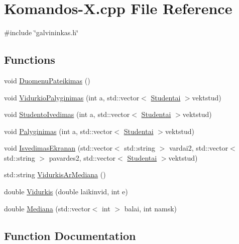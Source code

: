 \hypertarget{_komandos-_x_8cpp}{}\section{Komandos-\/X.cpp File Reference}
\label{_komandos-_x_8cpp}
{\ttfamily \#include \char`\"{}galvininkas.\+h\char`\"{}}\newline
\subsection*{Functions}
\begin{DoxyCompactItemize}
\item 
void \mbox{\hyperlink{_komandos-_x_8cpp_ac2cf944f764c5ea6b285cb2e188d9867}{Duomenu\+Pateikimas}} ()
\item 
void \mbox{\hyperlink{_komandos-_x_8cpp_a0dfe7eb39e8dd9d8c83d866739c5c712}{Vidurkio\+Palyginimas}} (int a, std\+::vector$<$ \mbox{\hyperlink{class_studentai}{Studentai}} $>$vektstud)
\item 
void \mbox{\hyperlink{_komandos-_x_8cpp_a1fb40ae6d3463fe6cce823fd3261abe5}{Studento\+Ivedimas}} (int a, std\+::vector$<$ \mbox{\hyperlink{class_studentai}{Studentai}} $>$vektstud)
\item 
void \mbox{\hyperlink{_komandos-_x_8cpp_a32e6fe3b9a2349d258a6f67ce0331b0c}{Palyginimas}} (int a, std\+::vector$<$ \mbox{\hyperlink{class_studentai}{Studentai}} $>$vektstud)
\item 
void \mbox{\hyperlink{_komandos-_x_8cpp_ae8c00302f468b7b77bd196d1058b3d00}{Isvedimas\+Ekranan}} (std\+::vector$<$ std\+::string $>$ vardai2, std\+::vector$<$ std\+::string $>$ pavardes2, std\+::vector$<$ \mbox{\hyperlink{class_studentai}{Studentai}} $>$vektstud)
\item 
std\+::string \mbox{\hyperlink{_komandos-_x_8cpp_ac18b091e5da5d98faf40a60e2dfac1c3}{Vidurkis\+Ar\+Mediana}} ()
\item 
double \mbox{\hyperlink{_komandos-_x_8cpp_a12fea27f5ccb0b6914f7fd90bc888be9}{Vidurkis}} (double laikinvid, int e)
\item 
double \mbox{\hyperlink{_komandos-_x_8cpp_a7d536233ded6efdd4a660ea68fd71368}{Mediana}} (std\+::vector$<$ int $>$ balai, int namsk)
\end{DoxyCompactItemize}


\subsection{Function Documentation}
\mbox{\label{_komandos-_x_8cpp_ac2cf944f764c5ea6b285cb2e188d9867}} 
